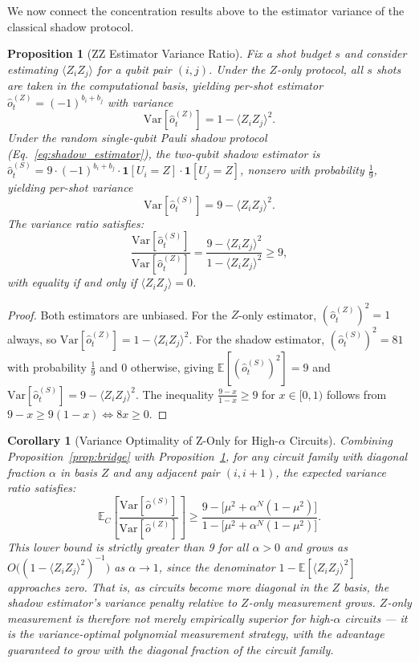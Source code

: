 \documentclass[conference]{IEEEtran}
\newtheorem{proposition}[theorem]{Proposition}
\newtheorem{corollary}[theorem]{Corollary}
\begin{document}
We now connect the concentration results above to the estimator variance of the classical shadow protocol.

\begin{proposition}[ZZ Estimator Variance Ratio]
\label{prop:variance_ratio}
Fix a shot budget $s$ and consider estimating $\langle Z_iZ_j\rangle$ for a qubit pair $(i,j)$. Under the $Z$-only protocol, all $s$ shots are taken in the computational basis, yielding per-shot estimator $\hat{o}^{(Z)}_t = (-1)^{b_i + b_j}$ with variance
\[
\mathrm{Var}[\hat{o}^{(Z)}_t] = 1 - \langle Z_iZ_j\rangle^2.
\]
Under the random single-qubit Pauli shadow protocol (Eq.~\eqref{eq:shadow_estimator}), the two-qubit shadow estimator is $\hat{o}^{(S)}_t = 9\cdot(-1)^{b_i+b_j}\cdot\mathbf{1}[U_i=Z]\cdot\mathbf{1}[U_j=Z]$, nonzero with probability $\frac{1}{9}$, yielding per-shot variance
\[
\mathrm{Var}[\hat{o}^{(S)}_t] = 9 - \langle Z_iZ_j\rangle^2.
\]
The variance ratio satisfies:
\[
\frac{\mathrm{Var}[\hat{o}^{(S)}_t]}{\mathrm{Var}[\hat{o}^{(Z)}_t]} = \frac{9 - \langle Z_iZ_j\rangle^2}{1 - \langle Z_iZ_j\rangle^2} \geq 9,
\]
with equality if and only if $\langle Z_iZ_j\rangle = 0$.
\end{proposition}

\begin{proof}
Both estimators are unbiased. For the $Z$-only estimator, $(\hat{o}^{(Z)}_t)^2 = 1$ always, so $\mathrm{Var}[\hat{o}^{(Z)}_t] = 1 - \langle Z_iZ_j\rangle^2$. For the shadow estimator, $(\hat{o}^{(S)}_t)^2 = 81$ with probability $\frac{1}{9}$ and $0$ otherwise, giving $\mathbb{E}[(\hat{o}^{(S)}_t)^2] = 9$ and $\mathrm{Var}[\hat{o}^{(S)}_t] = 9 - \langle Z_iZ_j\rangle^2$. The inequality $\frac{9-x}{1-x} \geq 9$ for $x \in [0,1)$ follows from $9 - x \geq 9(1-x) \Leftrightarrow 8x \geq 0$.
\end{proof}

\begin{corollary}[Variance Optimality of Z-Only for High-$\alpha$ Circuits]
\label{cor:variance_optimality}
Combining Proposition~\ref{prop:bridge} with Proposition~\ref{prop:variance_ratio}, for any circuit family with diagonal fraction $\alpha$ in basis $Z$ and any adjacent pair $(i, i+1)$, the expected variance ratio satisfies:
\[
\mathbb{E}_C\!\left[\frac{\mathrm{Var}[\hat{o}^{(S)}]}{\mathrm{Var}[\hat{o}^{(Z)}]}\right] \geq \frac{9 - \bigl[\mu^2 + \alpha^N(1-\mu^2)\bigr]}{1 - \bigl[\mu^2 + \alpha^N(1-\mu^2)\bigr]}.
\]
This lower bound is strictly greater than 9 for all $\alpha > 0$ and grows as $O\bigl((1 - \langle Z_iZ_j\rangle^2)^{-1}\bigr)$ as $\alpha \to 1$, since the denominator $1 - \mathbb{E}[\langle Z_iZ_j\rangle^2]$ approaches zero. That is, as circuits become more diagonal in the $Z$ basis, the shadow estimator's variance penalty relative to $Z$-only measurement grows. $Z$-only measurement is therefore not merely empirically superior for high-$\alpha$ circuits --- it is the \emph{variance-optimal polynomial measurement strategy}, with the advantage guaranteed to grow with the diagonal fraction of the circuit family.
\end{corollary}
\end{document}
